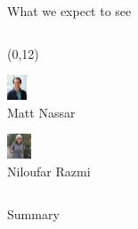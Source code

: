 \documentclass[bigger]{beamer}
\begin{document}
\begin{frame}[label={sec:orgd621130}]{What we expect to see}
\begin{columns}
\begin{column}{0.5\columnwidth}

\begin{textblock}{5}(0,12)
\begin{minipage}[t]{3em}
\center
\includegraphics[height=2em]{img/matt-nassar.jpg}\\
\scriptsize
Matt Nassar
\end{minipage}
\begin{minipage}[t]{3em}
\center
\includegraphics[height=2em]{img/niloufar-razmi.jpeg}\\
\scriptsize
Niloufar Razmi
\end{minipage}
\end{textblock}
\end{column}
\end{columns}
\end{frame}

\begin{frame}[label={sec:org4abe39b}]{Summary}
\end{frame}
\end{document}
